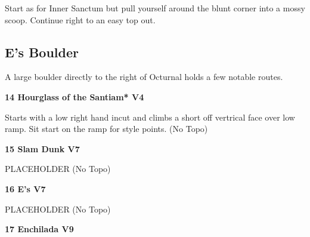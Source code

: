 \begin{multicols}{2}
\begin{minipage}{\linewidth}
					\begin{adjustwidth}{0.5cm}{}				
					Start as for Inner Sanctum but pull yourself around the blunt corner into a mossy scoop. Continue right to an easy top out.
					\end{adjustwidth}
					\end{minipage}
			\subsection*{E's Boulder}\label{bf:E's Boulder}
			\begin{minipage}{\columnwidth}
			A large boulder directly to the right of Octurnal holds a few notable routes.
			\end{minipage}
			
					\begin{minipage}{\linewidth}	
					\label{rt:Hourglass of the Santiam}
\colorbox{RoyalBlue!20}{
\textbf{
14 Hourglass of the Santiam* V4      
}
}

					\begin{adjustwidth}{0.5cm}{}				
					Starts with a low right hand incut and climbs a short off vertrical face over low ramp. Sit start on the ramp for style points.
						\newline (No Topo) 
					\end{adjustwidth}
					\end{minipage}
					\begin{minipage}{\linewidth}	
					\label{rt:Slam Dunk}
\colorbox{Goldenrod!50}{
\textbf{
15 Slam Dunk V7  
}
}

					\begin{adjustwidth}{0.5cm}{}				
					PLACEHOLDER
						\newline (No Topo) 
					\end{adjustwidth}
					\end{minipage}
					\begin{minipage}{\linewidth}	
					\label{rt:E's}
\colorbox{Goldenrod!50}{
\textbf{
16 E's V7  
}
}

					\begin{adjustwidth}{0.5cm}{}				
					PLACEHOLDER
						\newline (No Topo) 
					\end{adjustwidth}
					\end{minipage}

					\begin{minipage}{\linewidth}	
					\label{rt:Enchilada}
\colorbox{Goldenrod!50}{
\textbf{
17 Enchilada V9    
}
}


\end{minipage}
\end{multicols}
